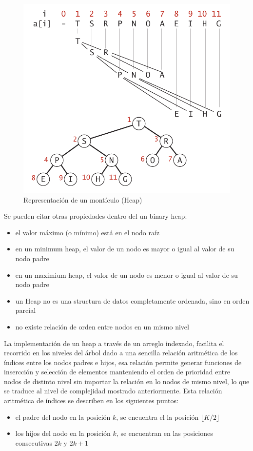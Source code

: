 \documentclass[letterpaper]{article}
\begin{document}
\begin{figure}[H]
\includegraphics[width=.45\textwidth]{Images/heap2.png}
\centering
\caption{Representación de un montículo (Heap)}
\label{fig:heaprep}
\end{figure}

Se pueden citar otras propiedades dentro del un binary heap:
\begin{itemize}
\item el valor máximo (o mínimo) está en el nodo raíz
\item en un minimum heap, el valor de un nodo es mayor o igual al valor de su nodo padre
\item en un maximium heap, el valor de un nodo es menor o igual al valor de su nodo padre
\item un Heap no es una structura de datos completamente ordenada, sino en orden parcial
\item no existe relación de orden entre nodos en un mismo nivel
\end{itemize}


La implementación de un heap a través de un arreglo indexado, facilita el recorrido en los niveles del árbol dado a una sencilla relación aritmética de los índices entre los nodos padres e hijos, esa relación permite generar funciones de insercción y selección de elementos manteniendo el orden de prioridad entre nodos de distinto nivel sin importar la relación en lo nodos de mismo nivel, lo que se traduce al nivel de complejidad mostrado anteriormente. Esta relación aritmética de índices se describen en los siguientes puntos:

\begin{itemize}
\item el padre del nodo en la posición $k$, se encuentra el la posición $\lfloor K/2\rfloor$
\item los hijos del nodo en la posición $k$, se encuentran en las posiciones consecutivas $2k$ y $2k+1$
\end{itemize}
\end{document}
